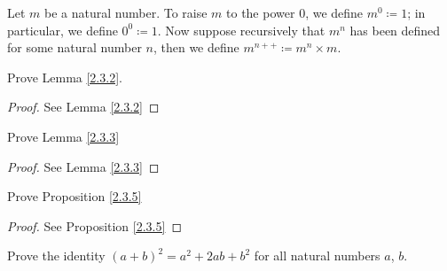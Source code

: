 \begin{definition}\label{2.3.11}
Let \(m\) be a natural number.
To raise \(m\) to the power \(0\), we define \(m^0 \coloneqq 1\); in particular, we define \(0^0 \coloneqq 1\).
Now suppose recursively that \(m^n\) has been defined for some natural number \(n\), then we define \(m^{n++} \coloneqq m^n \times m\).
\end{definition}

\exercisesection

\begin{exercise}\label{ex 2.3.1}
Prove Lemma \ref{2.3.2}.
\end{exercise}

\begin{proof}
See Lemma \ref{2.3.2}
\end{proof}

\begin{exercise}\label{ex 2.3.2}
Prove Lemma \ref{2.3.3}
\end{exercise}

\begin{proof}
See Lemma \ref{2.3.3}
\end{proof}

\begin{exercise}\label{ex 2.3.3}
Prove Proposition \ref{2.3.5}
\end{exercise}

\begin{proof}
See Proposition \ref{2.3.5}
\end{proof}

\begin{exercise}\label{ex 2.3.4}
Prove the identity \((a + b)^2 = a^2 + 2ab + b^2\) for all natural numbers \(a\), \(b\).
\end{exercise}

